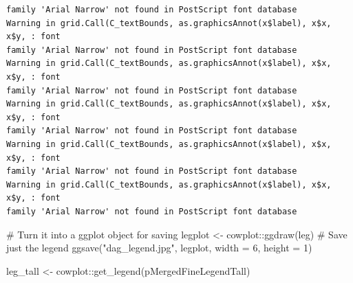\documentclass[
  letterpaper,
  DIV=11,
  numbers=noendperiod]{scrartcl}
\newenvironment{Shaded}{\begin{snugshade}}{\end{snugshade}}
\newcommand{\AttributeTok}[1]{\textcolor[rgb]{0.40,0.45,0.13}{#1}}
\newcommand{\CommentTok}[1]{\textcolor[rgb]{0.37,0.37,0.37}{#1}}
\newcommand{\DecValTok}[1]{\textcolor[rgb]{0.68,0.00,0.00}{#1}}
\newcommand{\FunctionTok}[1]{\textcolor[rgb]{0.28,0.35,0.67}{#1}}
\newcommand{\NormalTok}[1]{\textcolor[rgb]{0.00,0.23,0.31}{#1}}
\newcommand{\OtherTok}[1]{\textcolor[rgb]{0.00,0.23,0.31}{#1}}
\newcommand{\SpecialCharTok}[1]{\textcolor[rgb]{0.37,0.37,0.37}{#1}}
\newcommand{\StringTok}[1]{\textcolor[rgb]{0.13,0.47,0.30}{#1}}
\begin{document}
\begin{verbatim}
family 'Arial Narrow' not found in PostScript font database
Warning in grid.Call(C_textBounds, as.graphicsAnnot(x$label), x$x, x$y, : font
family 'Arial Narrow' not found in PostScript font database
Warning in grid.Call(C_textBounds, as.graphicsAnnot(x$label), x$x, x$y, : font
family 'Arial Narrow' not found in PostScript font database
Warning in grid.Call(C_textBounds, as.graphicsAnnot(x$label), x$x, x$y, : font
family 'Arial Narrow' not found in PostScript font database
Warning in grid.Call(C_textBounds, as.graphicsAnnot(x$label), x$x, x$y, : font
family 'Arial Narrow' not found in PostScript font database
Warning in grid.Call(C_textBounds, as.graphicsAnnot(x$label), x$x, x$y, : font
family 'Arial Narrow' not found in PostScript font database
\end{verbatim}

\begin{Shaded}
\begin{Highlighting}[]
\CommentTok{\# Turn it into a ggplot object for saving}
\NormalTok{legplot }\OtherTok{\textless{}{-}}\NormalTok{ cowplot}\SpecialCharTok{::}\FunctionTok{ggdraw}\NormalTok{(leg)}
\CommentTok{\# Save just the legend}
\FunctionTok{ggsave}\NormalTok{(}\StringTok{"dag\_legend.jpg"}\NormalTok{, legplot, }\AttributeTok{width =} \DecValTok{6}\NormalTok{, }\AttributeTok{height =} \DecValTok{1}\NormalTok{)}

\NormalTok{leg\_tall }\OtherTok{\textless{}{-}}\NormalTok{ cowplot}\SpecialCharTok{::}\FunctionTok{get\_legend}\NormalTok{(pMergedFineLegendTall)}
\end{Highlighting}
\end{Shaded}
\end{document}
